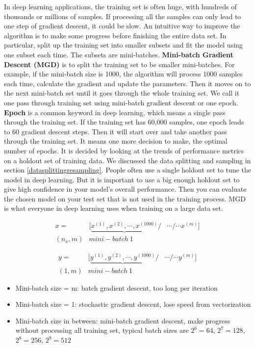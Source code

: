 \documentclass[
  12pt,
]{krantz}
\providecommand{\tightlist}{%
  \setlength{\itemsep}{0pt}\setlength{\parskip}{0pt}}
\begin{document}
In deep learning applications, the training set is often huge, with hundreds of thousands or millions of samples. If processing all the samples can only lead to one step of gradient descent, it could be slow. An intuitive way to improve the algorithm is to make some progress before finishing the entire data set. In particular, split up the training set into smaller subsets and fit the model using one subset each time. The subsets are mini-batches. \textbf{Mini-batch Gradient Descent (MGD)} is to split the training set to be smaller mini-batches. For example, if the mini-batch size is 1000, the algorithm will process 1000 samples each time, calculate the gradient and update the parameters. Then it moves on to the next mini-batch set until it goes through the whole training set. We call it one pass through training set using mini-batch gradient descent or one epoch. \textbf{Epoch} is a common keyword in deep learning, which means a single pass through the training set. If the training set has 60,000 samples, one epoch leads to 60 gradient descent steps. Then it will start over and take another pass through the training set. It means one more decision to make, the optimal number of epochs. It is decided by looking at the trends of performance metrics on a holdout set of training data. We discussed the data splitting and sampling in section \ref{datasplittingresampling}. People often use a single holdout set to tune the model in deep learning. But it is important to use a big enough holdout set to give high confidence in your model's overall performance. Then you can evaluate the chosen model on your test set that is not used in the training process. MGD is what everyone in deep learning uses when training on a large data set.

\[\begin{array}{ccc} x= & [\underbrace{x^{(1)},x^{(2)},\cdots,x^{(1000)}}/ & \cdots/\cdots x^{(m)}]\\ (n_{x},m) & mini-batch\ 1 \end{array}\]

\[\begin{array}{ccc} y= & [\underbrace{y^{(1)},y^{(2)},\cdots,y^{(1000)}}/ & \cdots/\cdots y^{(m)}]\\ (1,m) & mini-batch\ 1 \end{array}\]

\begin{itemize}
\tightlist
\item
  Mini-batch size = m: batch gradient descent, too long per iteration
\item
  Mini-batch size = 1: stochastic gradient descent, lose speed from vectorization
\item
  Mini-batch size in between: mini-batch gradient descent, make progress without processing all training set, typical batch sizes are \(2^6=64\), \(2^7=128\), \(2^8=256\), \(2^9=512\)
\end{itemize}
\end{document}
